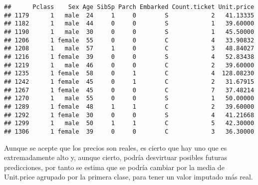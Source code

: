 \documentclass[
]{article}
\newenvironment{Shaded}{\begin{snugshade}}{\end{snugshade}}
\newcommand{\CommentTok}[1]{\textcolor[rgb]{0.50,0.62,0.50}{#1}}
\newcommand{\DecValTok}[1]{\textcolor[rgb]{0.86,0.86,0.80}{#1}}
\newcommand{\KeywordTok}[1]{\textcolor[rgb]{0.94,0.87,0.69}{#1}}
\newcommand{\NormalTok}[1]{\textcolor[rgb]{0.80,0.80,0.80}{#1}}
\newcommand{\OperatorTok}[1]{\textcolor[rgb]{0.94,0.94,0.82}{#1}}
\newcommand{\StringTok}[1]{\textcolor[rgb]{0.80,0.58,0.58}{#1}}
\begin{document}
\begin{verbatim}
##      Pclass    Sex Age SibSp Parch Embarked Count.ticket Unit.price
## 1179      1   male  24     1     0        S            2   41.13335
## 1182      1   male  44     0     0        S            1   39.60000
## 1190      1   male  30     0     0        S            1   45.50000
## 1206      1 female  55     0     0        C            4   33.90832
## 1208      1   male  57     1     0        C            3   48.84027
## 1216      1 female  39     0     0        S            4   52.83438
## 1219      1   male  46     0     0        C            2   39.60000
## 1235      1 female  58     0     1        C            4  128.08230
## 1242      1 female  45     0     1        C            2   31.67915
## 1267      1 female  45     0     0        C            7   37.48214
## 1270      1   male  55     0     0        S            1   50.00000
## 1289      1 female  48     1     1        C            2   39.60000
## 1292      1 female  30     0     0        S            4   41.21668
## 1299      1   male  50     1     1        C            5   42.30000
## 1306      1 female  39     0     0        C            3   36.30000
\end{verbatim}

Aunque se acepte que los precios son reales, es cierto que hay uno que
es extremadamente alto y, aunque cierto, podría desvirtuar posibles
futuras predicciones, por tanto se estima que se podría cambiar por la
media de Unit.price agrupado por la primera clase, para tener un valor
imputado más real.

\begin{Shaded}
\end{Shaded}

\begin{Shaded}
\end{Shaded}
\end{document}
